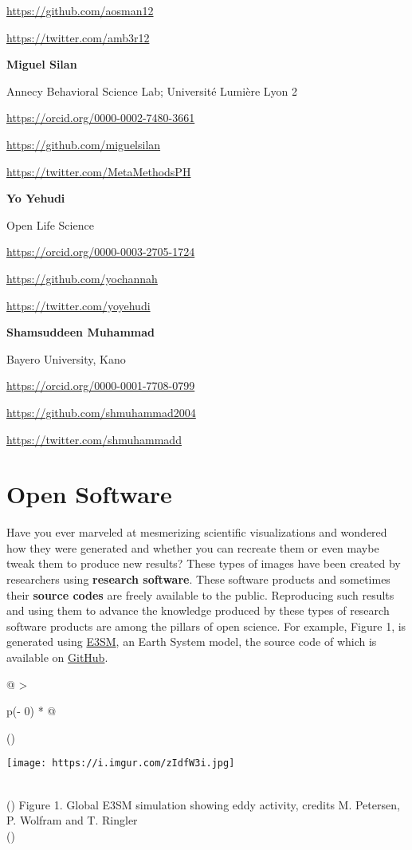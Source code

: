 \documentclass[
  letterpaper,
  DIV=11,
  numbers=noendperiod]{scrreport}
\begin{document}
\url{https://github.com/aosman12}

\url{https://twitter.com/amb3r12}

\textbf{Miguel Silan}

Annecy Behavioral Science Lab; Université Lumière Lyon 2

\url{https://orcid.org/0000-0002-7480-3661}

\url{https://github.com/miguelsilan}

\url{https://twitter.com/MetaMethodsPH}

\textbf{Yo Yehudi}

Open Life Science

\url{https://orcid.org/0000-0003-2705-1724}

\url{https://github.com/yochannah}

\url{https://twitter.com/yoyehudi}

\textbf{Shamsuddeen Muhammad}

Bayero University, Kano

\url{https://orcid.org/0000-0001-7708-0799}

\url{https://github.com/shmuhammad2004}

\url{https://twitter.com/shmuhammadd}

\part{Open Software}

Have you ever marveled at mesmerizing scientific visualizations and
wondered how they were generated and whether you can recreate them or
even maybe tweak them to produce new results? These types of images have
been created by researchers using \textbf{research software}. These
software products and sometimes their \textbf{source codes} are freely
available to the public. Reproducing such results and using them to
advance the knowledge produced by these types of research software
products are among the pillars of open science. For example, Figure 1,
is generated using \href{https://e3sm.org/}{E3SM}, an Earth System
model, the source code of which is available on
\href{https://github.com/E3SM-Project/E3SM}{GitHub}.

\begin{longtable}[]{@{}
  >{\raggedright\arraybackslash}p{(\columnwidth - 0\tabcolsep) * }@{}}
\toprule()
\begin{minipage}[b]{\linewidth}\raggedright
\texttt{[image: https://i.imgur.com/zIdfW3i.jpg]}
\end{minipage} \\
\midrule()
\endhead
Figure 1. Global E3SM simulation showing eddy activity, credits M.
Petersen, P. Wolfram and T. Ringler \\
\bottomrule()
\end{longtable}
\end{document}
